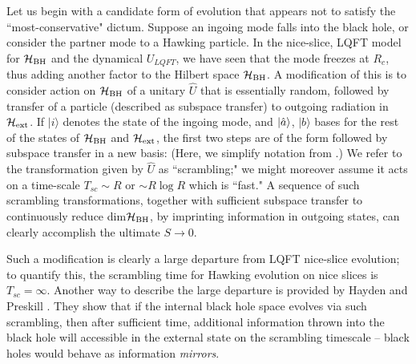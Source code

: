 Let us begin with a candidate form of evolution that appears not to satisfy the ``most-conservative" dictum.  Suppose an ingoing mode falls into the black hole, or consider the partner mode to a Hawking particle.  In the nice-slice, LQFT model for ${{\cal H}_{\rm BH}}$ and the dynamical $U_{LQFT}$, we have seen that the mode freezes at $R_c$, thus adding another factor to the Hilbert space ${{\cal H}_{\rm BH}}$.  A modification of this is to consider action  on ${{\cal H}_{\rm BH}}$ of a unitary ${\hat U}$ that is essentially random, followed by transfer of a particle (described as subspace transfer) to outgoing radiation in ${{\cal H}_{\rm ext}}$.  If $|i\rangle$ denotes the state of the ingoing mode, and $|{\hat a}\rangle$, $|b\rangle$ bases for the rest of the states of ${{\cal H}_{\rm BH}}$ and ${{\cal H}_{\rm ext}}$, the first two steps are of the form
%
\eqn{}
%
followed by subspace transfer in a new basis:
%
\eqn{}
%
(Here, we simplify notation from \subtrans.)  We refer to the transformation given by ${\hat U}$ as ``scrambling;" we might moreover assume it acts on a time-scale $T_{sc}\sim R$ or $\sim R\log R$  which is ``fast."  A sequence of such scrambling transformations, together with sufficient subspace transfer to continuously reduce dim${{\cal H}_{\rm BH}}$, by imprinting information in outgoing states, can clearly accomplish the ultimate $S\rightarrow0$.

Such a modification is clearly a large departure from LQFT nice-slice evolution; to quantify this, the scrambling time for Hawking evolution on nice slices is $T_{sc}=\infty$.  Another way to describe the large departure is provided by Hayden and Preskill \HaPr.  They show that if the internal black hole space evolves via such scrambling, then after sufficient time, additional information thrown into the black hole will accessible in the external state on the scrambling timescale -- black holes would behave as information {\it mirrors}.  

